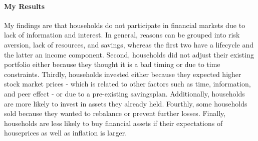 \documentclass[ProjectABM]{subfiles}
\begin{document}

\paragraph{My Results}
My findings are that households do not participate in financial markets due to lack of information and interest. In general, reasons can be grouped into risk aversion, lack of resources, and savings, whereas the first two have a lifecycle and the latter an income component. Second, households did not adjust their existing portfolio either because they thought it is a bad timing or due to time constraints. Thirdly, households invested either because they expected higher stock market prices - which is related to other factors such as time, information, and peer effect - or due to a pre-existing savingsplan. Additionally, households are more likely to invest in assets they already held. Fourthly, some households sold because they wanted to rebalance or prevent further losses. Finally, households are less likely to buy financial assets if their expectations of houseprices as well as inflation is larger.
\end{document}
